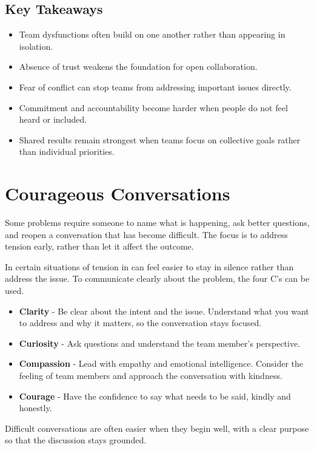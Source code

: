 \documentclass{report}
\begin{document}
		\subsection{Key Takeaways}

			\begin{itemize}
				\item Team dysfunctions often build on one another rather than appearing in isolation.
				\item Absence of trust weakens the foundation for open collaboration.
				\item Fear of conflict can stop teams from addressing important issues directly.
				\item Commitment and accountability become harder when people do not feel heard or included.
				\item Shared results remain strongest when teams focus on collective goals rather than individual priorities.
			\end{itemize}

	\section{Courageous Conversations}

		Some problems require someone to name what is happening, ask better questions, and reopen a conversation that has become difficult. The focus is to address tension early, rather than let it affect the outcome.

		In certain situations of tension in can feel easier to stay in silence rather than address the issue. To communicate clearly about the problem, the four C's can be used.

		\begin{itemize}
			\item \textbf{Clarity} - Be clear about the intent and the issue. Understand what you want to address and why it matters, so the conversation stays focused.
			\item \textbf{Curiosity} - Ask questions and understand the team member's perspective.
			\item \textbf{Compassion} - Lead with empathy and emotional intelligence. Consider the feeling of team members and approach the conversation with kindness.
			\item \textbf{Courage} - Have the confidence to say what needs to be said, kindly and honestly.
		\end{itemize}

		Difficult conversations are often easier when they begin well, with a clear purpose so that the discussion stays grounded.
\end{document}
